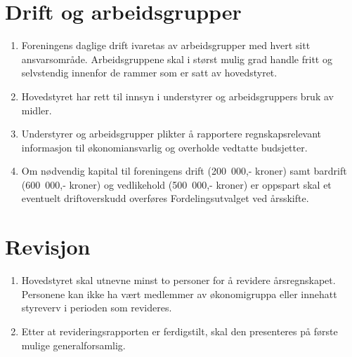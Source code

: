 \documentclass[8pt,norsk,a4paper]{article}
\begin{document}

\section{Drift og arbeidsgrupper}
\begin{enumerate}
	\item{Foreningens daglige drift ivaretas av arbeidsgrupper med hvert sitt ansvarsområde. Arbeidsgruppene skal i størst mulig grad handle fritt og selvstendig innenfor de rammer som er satt av hovedstyret.}
	\item{Hovedstyret har rett til innsyn i understyrer og arbeidsgruppers bruk av midler.}
	\item{Understyrer og arbeidsgrupper plikter å rapportere regnskapsrelevant informasjon til økonomiansvarlig og overholde vedtatte budsjetter.}
	\item{Om nødvendig kapital til foreningens drift (200~000,- kroner) samt bardrift (600~000,- kroner) og vedlikehold (500~000,- kroner) er oppspart skal et eventuelt driftoverskudd overføres Fordelingsutvalget ved årsskifte.}
\end{enumerate}

\section{Revisjon}
\begin{enumerate}
	\item{Hovedstyret skal utnevne minst to personer for å revidere årsregnskapet. Personene kan ikke ha vært medlemmer av økonomigruppa eller innehatt styreverv i perioden som revideres.}
	\item{Etter at revideringsrapporten er ferdigstilt, skal den presenteres på første mulige generalforsamlig.}
\end{enumerate}
\end{document}
